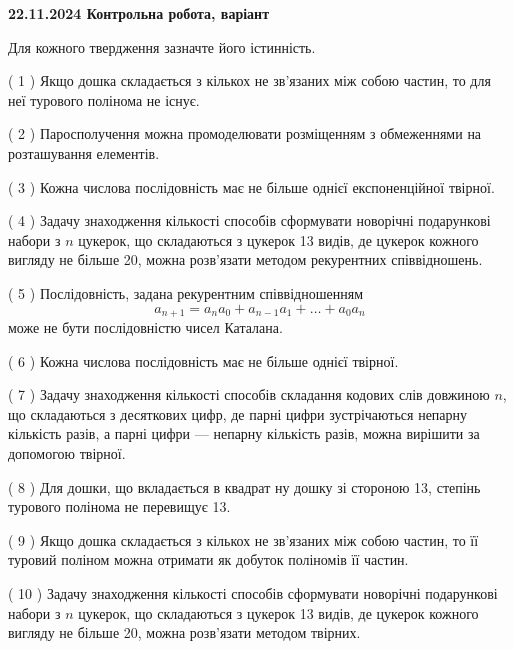 \documentclass[12pt, ukrainian]{article}
\begin{document}
\vspace{4mm}
\newpage
\begin {large}

\textbf{22.11.2024 Контрольна робота, варіант  }\par


{
Для кожного твердження зазначте його істинність.\par
\vspace{2mm}
( 1 ) Якщо дошка складається з кількох не зв’язаних між собою частин, то для неї турового полінома не існує.%

( 2 ) Паросполучення можна промоделювати розміщенням з обмеженнями на розташування елементів.%

( 3 ) Кожна числова послідовність має не більше однієї  експоненційної твірної.%

( 4 ) Задачу знаходження кількості способів сформувати новорічні подарункові набори з $n$ цукерок, що складаються з цукерок 13 видів, де цукерок кожного вигляду не більше 20, можна розв’язати методом рекурентних співвідношень.%

( 5 ) Послідовність, задана рекурентним співвідношенням $$a_{n+1}=a_{n}a_{0}+a_{n-1}a_{1}+\ldots+a_0a_{n}$$ може не бути послідовністю чисел Каталана.%

( 6 ) Кожна числова послідовність має не більше однієї твірної.%

( 7 ) Задачу знаходження кількості способів складання кодових слів довжиною $n$, що складаються з десяткових цифр, де парні цифри зустрічаються непарну кількість разів, а парні цифри — непарну кількість разів, можна вирішити за допомогою твірної.%

( 8 ) Для дошки, що вкладається в квадрат ну дошку зі стороною 13, степінь турового полінома не перевищує 13.%

( 9 ) Якщо дошка складається з кількох не зв’язаних між собою частин, то її туровий поліном можна отримати як добуток поліномів її частин.%

( 10 ) Задачу знаходження кількості способів сформувати новорічні подарункові набори з $n$ цукерок, що складаються з цукерок 13 видів, де цукерок кожного вигляду не більше 20, можна розв’язати методом твірних.%


\vspace{5mm}
}
\end {large}
\end{document}
